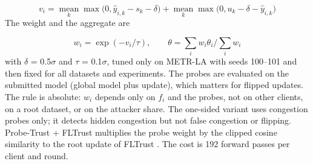 \documentclass[journal]{IEEEtran}
\begin{document}
\begin{equation}
v_i=\operatorname*{mean}_k\max\!\bigl(0,\hat y_{i,k}-s_k-\delta\bigr)+\operatorname*{mean}_k\max\!\bigl(0,u_k-\delta-\hat y_{i,k}\bigr)
\end{equation}
The weight and the aggregate are

\begin{equation}
w_i=\exp(-v_i/\tau),\qquad \theta=\sum_i w_i\theta_i\Big/\sum_i w_i
\end{equation}
with \ensuremath{\delta} = 0.5\ensuremath{\sigma} and \ensuremath{\tau} = 0.1\ensuremath{\sigma}, tuned only on METR-LA with seeds 100--101 and then fixed for all datasets and experiments. The probes are evaluated on the submitted model (global model plus update), which matters for flipped updates. The rule is absolute: $w_{i}$ depends only on $f_{i}$ and the probes, not on other clients, on a root dataset, or on the attacker share. The one-sided variant uses congestion probes only; it detects hidden congestion but not false congestion or flipping. Probe-Trust + FLTrust multiplies the probe weight by the clipped cosine similarity to the root update of FLTrust \cite{fltrust}. The cost is 192 forward passes per client and round.
\end{document}
